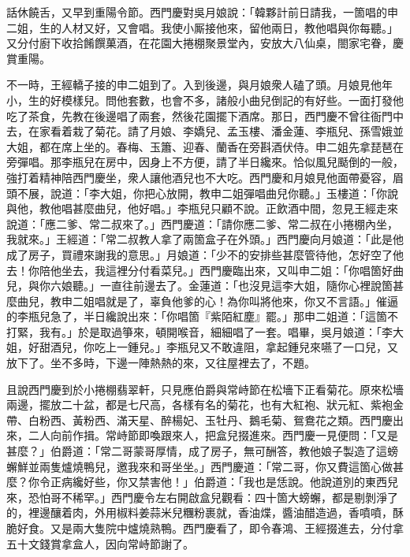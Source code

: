 話休饒舌，又早到重陽令節。西門慶對吳月娘說：「韓夥計前日請我，一箇唱的申二姐，生的人材又好，又會唱。我使小厮接他來，留他兩日，教他唱與你每聽。」又分付廚下收拾餚饌菓酒，在花園大捲棚聚景堂內，安放大八仙桌，閤家宅眷，慶賞重陽。

不一時，王經轎子接的申二姐到了。入到後邊，與月娘衆人磕了頭。月娘見他年小，生的好模樣兒。問他套數，也會不多，諸般小曲兒倒記的有好些。一面打發他吃了茶食，先教在後邊唱了兩套，然後花園擺下酒席。那日，西門慶不曾往衙門中去，在家看着栽了菊花。請了月娘、李嬌兒、孟玉樓、潘金蓮、李瓶兒、孫雪娥並大姐，都在席上坐的。春梅、玉簫、迎春、蘭香在旁斟酒伏侍。申二姐先拿琵琶在旁彈唱。那李瓶兒在房中，因身上不方便，請了半日纔來。恰似風兒颳倒的一般，強打着精神陪西門慶坐，衆人讓他酒兒也不大吃。西門慶和月娘見他面帶憂容，眉頭不展，說道：「李大姐，你把心放開，教申二姐彈唱曲兒你聽。」玉樓道：「你說與他，教他唱甚麼曲兒，他好唱。」李瓶兒只顧不說。正飲酒中間，忽見王經走來說道：「應二爹、常二叔來了。」西門慶道：「請你應二爹、常二叔在小捲棚內坐，我就來。」王經道：「常二叔教人拿了兩箇盒子在外頭。」西門慶向月娘道：「此是他成了房子，買禮來謝我的意思。」月娘道：「少不的安排些甚麼管待他，怎好空了他去！你陪他坐去，我這裡分付看菜兒。」{}西門慶臨出來，又叫申二姐：「你唱箇好曲兒，與你六娘聽。」一直往前邊去了。金蓮道：「也沒見這李大姐，隨你心裡說箇甚麼曲兒，教申二姐唱就是了，辜負他爹的心！為你叫將他來，你又不言語。」催逼的李瓶兒急了，半日纔說出來：「你唱箇『紫陌紅塵』罷。」那申二姐道：「這箇不打緊，我有。」於是取過箏來，頓開喉音，細細唱了一套。唱畢，吳月娘道：「李大姐，好甜酒兒，你吃上一鍾兒。」李瓶兒又不敢違阻，拿起鍾兒來嚥了一口兒，又放下了。坐不多時，下邊一陣熱熱的來，又往屋裡去了，不題。

且說西門慶到於小捲棚翡翠軒，只見應伯爵與常峙節在松墻下正看菊花。原來松墻兩邊，擺放二十盆，都是七尺高，各樣有名的菊花，{}也有大紅袍、狀元紅、紫袍金帶、白粉西、黃粉西、滿天星、醉楊妃、玉牡丹、鵝毛菊、鴛鴦花之類。西門慶出來，二人向前作揖。常峙節即喚跟來人，把盒兒掇進來。西門慶一見便問：「又是甚麼？」伯爵道：「常二哥蒙哥厚情，成了房子，無可酬答，教他娘子製造了這螃蠏鮮並兩隻爐燒鴨兒，邀我來和哥坐坐。」西門慶道：「常二哥，你又費這箇心做甚麼？你令正病纔好些，你又禁害他！」伯爵道：「我也是恁說。他說道別的東西兒來，恐怕哥不稀罕。」西門慶令左右開啟盒兒觀看：四十箇大螃蠏，都是剔剝淨了的，裡邊釀着肉，外用椒料姜蒜米兒糰粉裹就，香油煠，醬油醋造過，香噴噴，酥脆好食。又是兩大隻院中爐燒熟鴨。西門慶看了，即令春鴻、王經掇進去，分付拿五十文錢賞拿盒人，因向常峙節謝了。

